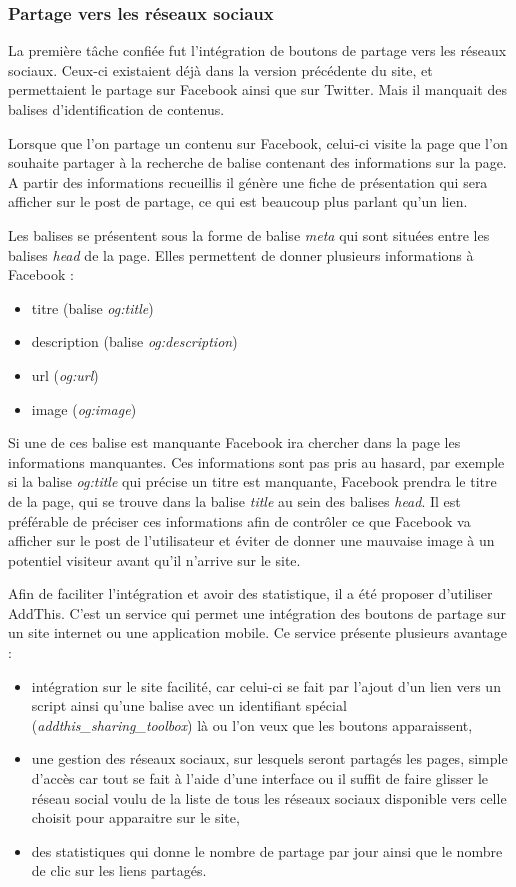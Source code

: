 \documentclass[12pt,a4paper]{article}
\begin{document}
\subsubsection{Partage vers les réseaux sociaux}
La première tâche confiée fut l'intégration de boutons de partage vers les réseaux sociaux. Ceux-ci existaient déjà dans la version précédente du site, et permettaient le partage sur Facebook ainsi que sur Twitter. Mais il manquait des balises d'identification de contenus.\par 
Lorsque que l'on partage un contenu sur Facebook, celui-ci visite la page que l'on souhaite partager à la recherche de balise contenant des informations sur la page. A partir des informations recueillis il génère une fiche de présentation qui sera afficher sur le post de partage, ce qui est beaucoup plus parlant qu'un lien.\par
Les balises se présentent sous la forme de balise \textit{meta} qui sont situées entre les balises \textit{head} de la page. Elles permettent de donner plusieurs informations à Facebook :
\begin{itemize}
\item titre (balise \textit{og:title})
\item description (balise \textit{og:description})
\item url (\textit{og:url})
\item image (\textit{og:image})
\end{itemize}
Si une de ces balise est manquante Facebook ira chercher dans la page les informations manquantes. Ces informations sont pas pris au hasard, par exemple si la balise \textit{og:title} qui précise un titre est manquante, Facebook prendra le titre de la page, qui se trouve dans la balise \textit{title} au sein des balises \textit{head}. Il est préférable de préciser ces informations afin de contrôler ce que Facebook va afficher sur le post de l'utilisateur et éviter de donner une mauvaise image à un potentiel visiteur avant qu'il n'arrive sur le site.\par
\bigskip
Afin de faciliter l'intégration et avoir des statistique, il a été proposer d'utiliser AddThis. C'est un service qui permet une intégration des boutons de partage sur un site internet ou une application mobile. Ce service présente plusieurs avantage : 
\begin{itemize}
\item intégration sur le site facilité, car celui-ci se fait par l'ajout d'un lien vers un script ainsi qu'une balise avec un identifiant spécial (\textit{addthis\_sharing\_toolbox}) là ou l'on veux que les boutons apparaissent,
\item une gestion des réseaux sociaux, sur lesquels seront partagés les pages, simple d'accès car tout se fait à l'aide d'une interface ou il suffit de faire glisser le réseau social voulu de la liste de tous les réseaux sociaux disponible vers celle choisit pour apparaitre sur le site,
\item des statistiques qui donne le nombre de partage par jour ainsi que le nombre de clic sur les liens partagés.
\end{itemize}\par
\end{document}
